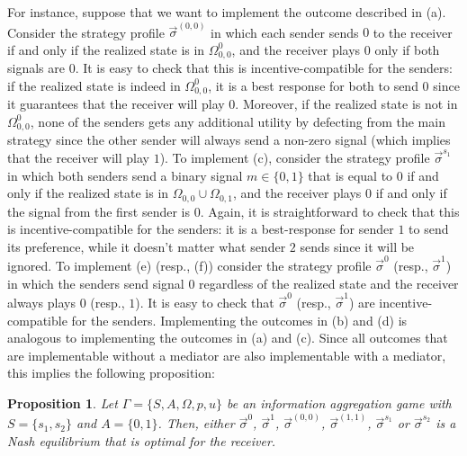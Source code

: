 \documentclass[submission,copyright,creativecommons]{eptcs}
\newtheorem{proposition}{Proposition}
\begin{document}
For instance, suppose that we want to implement the outcome described in (a). Consider the strategy profile $\vec{\sigma}^{(0,0)}$ in which each sender sends $0$ to the receiver if and only if the realized state is in $\Omega_{0,0}^0$, and the receiver plays $0$ only if both signals are $0$. It is easy to check that this is incentive-compatible for the senders: if the realized state is indeed in $\Omega_{0,0}^0$, it is a best response for both to send $0$ since it guarantees that the receiver will play $0$. Moreover, if the realized state is not in $\Omega_{0,0}^0$, none of the senders gets any additional utility by defecting from the main strategy since the other sender will always send a non-zero signal (which implies that the receiver will play $1$). To implement (c), consider the strategy profile $\vec{\sigma}^{s_1}$ in which both senders send a binary signal $m \in \{0,1\}$ that is equal to $0$ if and only if the realized state is in $\Omega_{0,0} \cup \Omega_{0,1}$, and the receiver plays $0$ if and only if the signal from the first sender is $0$. Again, it is straightforward to check that this is incentive-compatible for the senders: it is a best-response for sender $1$ to send its preference, while it doesn't matter what sender $2$ sends since it will be ignored. To implement (e) (resp., (f)) consider the strategy profile $\vec{\sigma}^0$ (resp., $\vec{\sigma}^1$) in which the senders send signal $0$ regardless of the realized state and the receiver always plays $0$ (resp., $1$). It is easy to check that $\vec{\sigma}^0$ (resp., $\vec{\sigma}^1$) are incentive-compatible for the senders. 
Implementing the outcomes in (b) and (d) is analogous to implementing the outcomes in (a) and (c).
Since all outcomes that are implementable without a mediator are also implementable with a mediator, this implies the following proposition:

\begin{proposition}\label{prop:two-senders-optimal}
Let $\Gamma = \{S, A, \Omega, p, u\}$ be an information aggregation game with $S = \{s_1, s_2\}$ and $A = \{0,1\}$. Then, either $\vec{\sigma}^0$, $\vec{\sigma}^1$, $\vec{\sigma}^{(0,0)}$, $\vec{\sigma}^{(1,1)}$, $\vec{\sigma}^{s_1}$ or $\vec{\sigma}^{s_2}$ is a Nash equilibrium that is optimal for the receiver.
\end{proposition}
\end{document}
